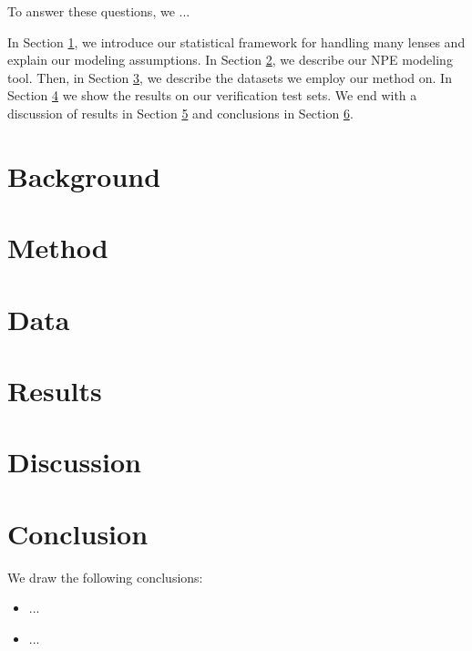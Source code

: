 \documentclass[iop]{desc-tex/styles/emulateapj}
\begin{document}
To answer these questions, we ...   

In Section \ref{section:background}, we introduce our statistical framework for handling many lenses and explain our modeling assumptions. In Section \ref{section:method}, we describe our NPE modeling tool. Then, in Section \ref{section:data}, we describe the datasets we employ our method on. In Section \ref{section:results} we show the results on our verification test sets. We end with a discussion of results in Section \ref{section:discussion} and conclusions in Section \ref{section:conclusion}.

\section{Background}
\label{section:background}



\section{Method}
\label{section:method}


\section{Data}
\label{section:data}


\section{Results}
\label{section:results}


\section{Discussion}
\label{section:discussion}


\section{Conclusion}
\label{section:conclusion}


We draw the following conclusions:

\begin{itemize}

    \item ...

    \item ...

\end{itemize}
\end{document}
